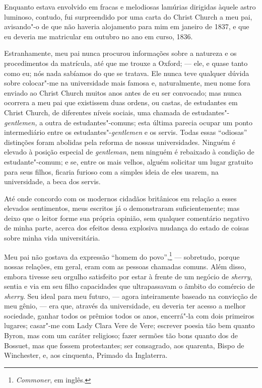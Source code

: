 Enquanto estava envolvido em fracas e melodiosas lamúrias dirigidas
àquele astro luminoso, contudo, fui surpreendido por uma carta do Christ
Church a meu pai, avisando"-o de que não haveria alojamento para mim em
janeiro de 1837, e que eu deveria me matricular em outubro no ano em
curso, 1836.

Estranhamente, meu pai nunca procurou informações sobre a natureza e os
procedimentos da matrícula, até que me trouxe a Oxford; --- ele, e quase
tanto como eu; nós nada sabíamos do que se tratava. Ele nunca teve
qualquer dúvida sobre colocar"-me na universidade mais famosa e,
naturalmente, meu nome fora enviado ao Christ Church muitos anos antes
de eu ser convocado; mas nunca ocorrera a meu pai que existissem duas
ordens, ou castas, de estudantes em Christ Church, de diferentes níveis
sociais, uma chamada de estudantes"-\textit{gentlemen,} a outra de
estudantes"-comuns; esta última parecia ocupar um ponto intermediário
entre os estudantes"-\textit{gentlemen} e os servis. Todas essas
``odiosas'' distinções foram abolidas pela reforma de nossas
universidades. Ninguém é elevado à posição especial de \textit{gentleman},
nem ninguém é rebaixado à condição de estudante"-comum; e se, entre os
mais velhos, alguém solicitar um lugar gratuito para seus filhos,
ficaria furioso com a simples ideia de eles usarem, na universidade, a
beca dos servis.

Até onde concordo com os modernos cidadãos britânicos em relação a
esses elevados sentimentos, meus escritos já o demonstraram
suficientemente; mas deixo que o leitor forme sua própria opinião, sem
qualquer comentário negativo de minha parte, acerca dos efeitos dessa
explosiva mudança do estado de coisas sobre minha vida universitária.

Meu pai não gostava da expressão ``homem do povo'',\footnote{\textit{Commoner},
  em inglês.} --- sobretudo, porque nossas relações, em
geral, eram com as pessoas chamadas comuns. Além disso, embora tivesse
seu orgulho satisfeito por estar à frente de um negócio de
\textit{sherry}, sentia e via em seu filho capacidades que ultrapassavam o
âmbito do comércio de \textit{sherry}. Seu ideal para meu futuro, --- agora
inteiramente baseado na convicção de meu gênio, --- era que, através da
universidade, eu deveria ter acesso a melhor sociedade, ganhar todos os
prêmios todos os anos, encerrá"-la com dois primeiros lugares; casar"-me
com Lady Clara Vere de Vere; escrever poesia tão bem quanto Byron, mas \label{212}
com um caráter religioso; fazer sermões tão bons quanto dos de Bossuet,
mas que fossem protestantes; ser consagrado, aos quarenta, Bispo de
Winchester, e, aos cinquenta, Primado da Inglaterra.

